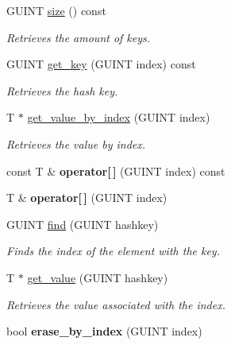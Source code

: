 \begin{DoxyCompactItemize}
\item 
\hypertarget{classgim__hash__table_aa24edf41f1a5f7ee28f6d1f12e3922c3}{G\+U\+I\+N\+T \hyperlink{classgim__hash__table_aa24edf41f1a5f7ee28f6d1f12e3922c3}{size} () const }\label{classgim__hash__table_aa24edf41f1a5f7ee28f6d1f12e3922c3}

\begin{DoxyCompactList}\small\item\em Retrieves the amount of keys. \end{DoxyCompactList}\item 
\hypertarget{classgim__hash__table_ad735b8794a51eca1caee6de5bbc4cf90}{G\+U\+I\+N\+T \hyperlink{classgim__hash__table_ad735b8794a51eca1caee6de5bbc4cf90}{get\+\_\+key} (G\+U\+I\+N\+T index) const }\label{classgim__hash__table_ad735b8794a51eca1caee6de5bbc4cf90}

\begin{DoxyCompactList}\small\item\em Retrieves the hash key. \end{DoxyCompactList}\item 
\hypertarget{classgim__hash__table_ab5ec54c3096e790e8c7ae570300df95d}{T $\ast$ \hyperlink{classgim__hash__table_ab5ec54c3096e790e8c7ae570300df95d}{get\+\_\+value\+\_\+by\+\_\+index} (G\+U\+I\+N\+T index)}\label{classgim__hash__table_ab5ec54c3096e790e8c7ae570300df95d}

\begin{DoxyCompactList}\small\item\em Retrieves the value by index. \end{DoxyCompactList}\item 
\hypertarget{classgim__hash__table_ad351cb7b341e45ce20f052ebe1409084}{const T \& {\bfseries operator\mbox{[}$\,$\mbox{]}} (G\+U\+I\+N\+T index) const }\label{classgim__hash__table_ad351cb7b341e45ce20f052ebe1409084}

\item 
\hypertarget{classgim__hash__table_a0df819cc9b510d933132f2e5d5f87488}{T \& {\bfseries operator\mbox{[}$\,$\mbox{]}} (G\+U\+I\+N\+T index)}\label{classgim__hash__table_a0df819cc9b510d933132f2e5d5f87488}

\item 
G\+U\+I\+N\+T \hyperlink{classgim__hash__table_a14261b2d7de34188f8bc5179e4d60760}{find} (G\+U\+I\+N\+T hashkey)
\begin{DoxyCompactList}\small\item\em Finds the index of the element with the key. \end{DoxyCompactList}\item 
T $\ast$ \hyperlink{classgim__hash__table_a40b5c46a0117da3948cd1b093f185321}{get\+\_\+value} (G\+U\+I\+N\+T hashkey)
\begin{DoxyCompactList}\small\item\em Retrieves the value associated with the index. \end{DoxyCompactList}\item 
\hypertarget{classgim__hash__table_abd4a9523a14496c9e3eacd7f790dad2c}{bool {\bfseries erase\+\_\+by\+\_\+index} (G\+U\+I\+N\+T index)}\label{classgim__hash__table_abd4a9523a14496c9e3eacd7f790dad2c}


\end{DoxyCompactItemize}
